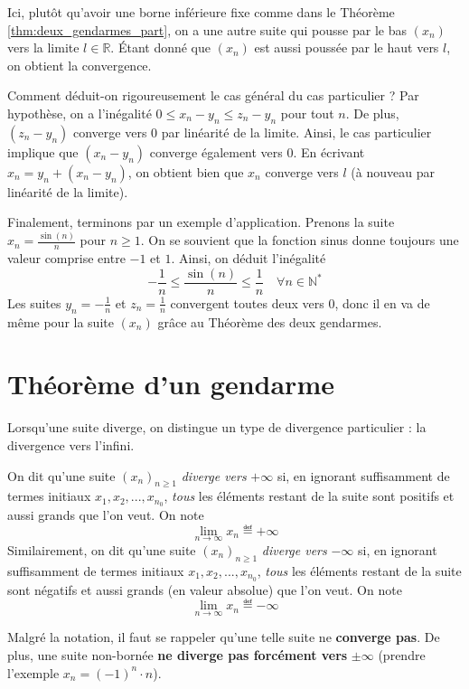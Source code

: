 Ici, plutôt qu'avoir une borne inférieure fixe comme dans le Théorème \ref{thm:deux_gendarmes_part}, on a une autre suite qui pousse par le bas $(x_n)$ vers la limite $l \in \mathbb R$. Étant donné que $(x_n)$ est aussi poussée par le haut vers $l$, on obtient la convergence.


Comment déduit-on rigoureusement le cas général du cas particulier ? Par hypothèse, on a l'inégalité $0 \leq x_n - y_n \leq z_n - y_n$ pour tout $n$. De plus, $(z_n - y_n)$ converge vers $0$ par linéarité de la limite. Ainsi, le cas particulier implique que $(x_n - y_n)$ converge également vers $0$. En écrivant $x_n = y_n + (x_n - y_n)$, on obtient bien que $x_n$ converge vers $l$ (à nouveau par linéarité de la limite).

Finalement, terminons par un exemple d'application. Prenons la suite $x_n = \frac{\sin(n)}{n}$ pour $n \geq 1$. On se souvient que la fonction sinus donne toujours une valeur comprise entre $-1$ et $1$. Ainsi, on déduit l'inégalité
\[
-\frac{1}{n} \leq \frac{\sin(n)}{n} \leq \frac{1}{n} \quad \forall n \in \mathbb N^*
\]
Les suites $y_n = -\frac{1}{n}$ et $z_n = \frac{1}{n}$ convergent toutes deux vers $0$, donc il en va de même pour la suite $(x_n)$ grâce au Théorème des deux gendarmes.

\section{Théorème d'un gendarme}

Lorsqu'une suite diverge, on distingue un type de divergence particulier : la divergence vers l'infini.

\begin{boxdef}\label{def:divergence}
On dit qu'une suite $(x_n)_{n \geq 1}$ \emph{diverge vers} $+\infty$ si, en ignorant suffisamment de termes initiaux $x_1, x_2, ..., x_{n_0}$, \emph{tous} les éléments restant de la suite sont positifs et aussi grands que l'on veut. On note 
\[
\lim \limits_{n \to \infty} x_n \eqdef +\infty
\]
Similairement, on dit qu'une suite $(x_n)_{n \geq 1}$ \emph{diverge vers} $-\infty$ si, en ignorant suffisamment de termes initiaux $x_1, x_2, ..., x_{n_0}$, \emph{tous} les éléments restant de la suite sont négatifs et aussi grands (en valeur absolue) que l'on veut. On note 
\[
\lim \limits_{n \to \infty} x_n \eqdef -\infty
\]
\end{boxdef}

Malgré la notation, il faut se rappeler qu'une telle suite ne \textbf{converge pas}. De plus, une suite non-bornée \textbf{ne diverge pas forcément vers} $\pm \infty$ (prendre l'exemple $x_n = (-1)^n \cdot n$).

